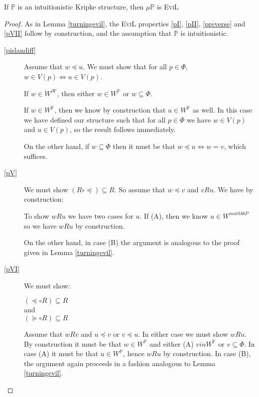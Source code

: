 \begin{lemma}\label{turningevil3}
If $\mathbb{P}$ is an intuitionistic Kripke structure, then $\mu
\mathbb{P}$ is \textsc{EviL}
\end{lemma}
\begin{proof}
As in Lemma \ref{turningevil}, the \textsc{EviL} properties \ref{pI}, \ref{pII}, \ref{preverse} and
\ref{pVII} follow by construction, and the assumption that
$\mathbb{P}$ is intuitionistic. 
 \begin{description}
    \item[\ref{pislandiff}]  Assume that $w\preccurlyeq u$.  We must
      show that for all $p \in \Phi$, $w \in V(p) \iff u \in V(p)$.

If $w \in W^{\partial\mathbb{P}}$, then either $w \in W^\mathbb{P}$ or
$w \subseteq \Phi$.

      If $w \in W^\mathbb{P}$, then we know by construction that $u
      \in W^\mathbb{P}$ as well.  In this case we have defined our
      structure such that for all $p \in \Phi$ we have $w \in V(p)$
      and $u \in V(p)$, so the result follows immediately.

     On the other hand, if $w \subseteq \Phi$ then it must be that $w \preccurlyeq u \iff w = v$, which suffices.

    \item[\ref{pV}]  We must show $(R \circ \preccurlyeq) \subseteq
      R$.  So assume that $w \preccurlyeq v$ and $v R u$.  We have by construction:


      To show $w R u$ we have two cases for $u$.  If (A), then we know
      $u \in W^{mathbb{P}}$ so we have $w R u$ by construction. 
      
      On the other hand, in case (B) the argument is analogous to the
      proof given in Lemma \ref{turningevil}.
    \item[\ref{pVI}]
We must show:
\begin{center}
 $(\preccurlyeq \circ R)
      \subseteq R$ \\
and\\
    $(\succcurlyeq \circ R) \subseteq
    R$
\end{center}
Assume that $w R v$ and $u \preccurlyeq v$ or $v \preccurlyeq u$.  In
either case we must show $w R u$.  By construction
      it must be that $w \in W^\mathbb{P}$ and either (A) $v in
      W^\mathbb{P}$ or $v \subseteq \Phi$.  In case (A) it must
      be that $u \in W^\mathbb{P}$, hence $w R u$ by construction.
      In case (B), the argument again proceeds in a
      fashion analogous to Lemma \ref{turningevil}.


\end{description}
\end{proof}
